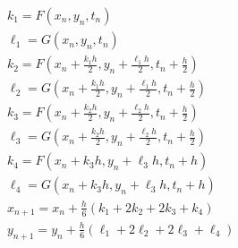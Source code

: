 \begin{subequations}
\begin{eqnarray}
&&   k_1  =  F(x_n, y_n,  t_n) \\
&&\ell_1  =  G(x_n, y_n, t_n) \\
&&   k_2  =  F(x_n + \frac{k_1 h}{2}, y_n + \frac{\ell_1 h}{2},t_n + \frac{h}{2} ) \\
&&\ell_2  =  G(x_n + \frac{k_1 h}{2}, y_n + \frac{\ell_1 h}{2},t_n + \frac{h}{2} ) \\
&&   k_3  =  F(x_n + \frac{k_2 h}{2}, y_n + \frac{\ell_2 h}{2},t_n + \frac{h}{2} ) \\
&&\ell_3  =  G(x_n + \frac{k_2 h}{2}, y_n + \frac{\ell_2 h}{2},t_n + \frac{h}{2} ) \\
&&   k_4  =  F(x_n + k_3 h, y_n + \ell_3 h, t_n + h) \\
&&\ell_4  =  G(x_n + k_3 h, y_n + \ell_3 h, t_n + h) \\
&&x_{n+1}  =  x_n +\displaystyle\frac{h}{6} ( k_1 + 2 k_2 + 2 k_3 + k_4 )\\
&&y_{n+1}  =  y_n +\displaystyle\frac{h}{6} ( \ell_1 + 2 \ell_2 + 2 \ell_3 + \ell_4 )
\end{eqnarray}
\end{subequations}



